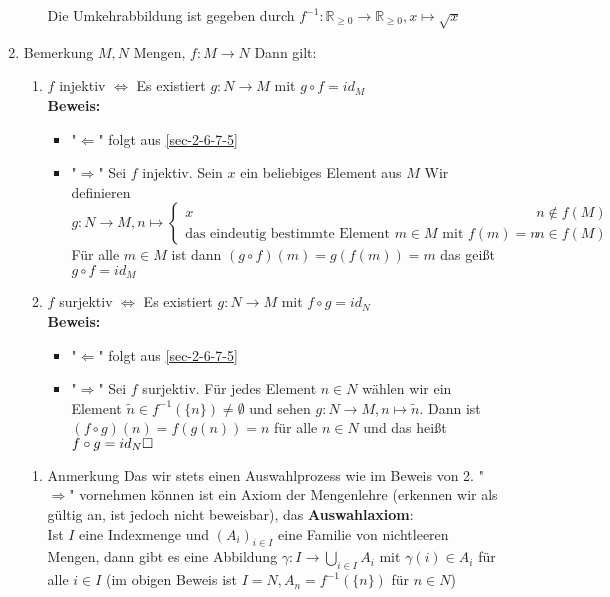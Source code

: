 \documentclass[11pt]{article}
\begin{document}
\begin{enumerate}
\begin{enumerate}
Die Umkehrabbildung ist gegeben durch $f^{-1}:\mathbb{R}_{\geq 0} \to \mathbb{R}_{\geq 0}, x\mapsto \sqrt{x}$
\end{enumerate}
\item Bemerkung
\label{sec-2-6-7-7}
$M,N$ Mengen, $f:M\to N$ Dann gilt:
\begin{enumerate}
\item $f$ injektiv $\Leftrightarrow$ Es existiert $g:N\to M$ mit $g\circ f = id_M$ \\
        \textbf{Beweis:}
\begin{itemize}
\item "$\Leftarrow$" folgt aus \ref{sec-2-6-7-5}
\item "$\Rightarrow$" Sei $f$ injektiv. Sein $x$ ein beliebiges Element aus $M$
          Wir definieren \[g:N\to M,n\mapsto \begin{cases} x & n\not\in f(M) \\ \text{das eindeutig bestimmte Element $m\in M$ mit $f(m) = n$} & n\in f(M) \end{cases}\]
          Für alle $m\in M$ ist dann $(g\circ f)(m) = g(f(m)) = m$ das geißt $g\circ f = id_M$
\end{itemize}
\item $f$ surjektiv $\Leftrightarrow$ Es existiert $g:N\to M$ mit $f\circ g = id_N$ \\
        \textbf{Beweis:}
\begin{itemize}
\item "$\Leftarrow$" folgt aus \ref{sec-2-6-7-5}
\item "$\Rightarrow$" Sei $f$ surjektiv. Für jedes Element $n\in N$ wählen wir ein Element $\tilde n\in f^{-1}(\{n\}) \neq \emptyset$ und sehen
$g:N\to M,n\mapsto \tilde n$. Dann ist $(f\circ g)(n) = f(g(n)) = n$ für alle $n\in N$ und das heißt $f\circ g = id_N \hfill\square$
\end{itemize}
\end{enumerate}
\begin{enumerate}
\item Anmerkung
\label{sec-2-6-7-7-1}
Das wir stets einen Auswahlprozess wie im Beweis von 2. "$\Rightarrow$" vornehmen können ist ein Axiom der Mengenlehre (erkennen wir als gültig an, ist jedoch nicht beweisbar), das \textbf{Auswahlaxiom}: \\
      Ist $I$ eine Indexmenge und $(A_i)_{i\in I}$ eine Familie von nichtleeren Mengen, dann gibt es eine Abbildung $\gamma:I\to \bigcup_{i\in I} A_i$ mit $\gamma (i) \in A_i$ für alle $i\in I$ (im obigen Beweis ist $I = N,A_n = f^{-1}(\{n\})$ für $n\in N$)

\end{enumerate}
\end{enumerate}
\end{document}

